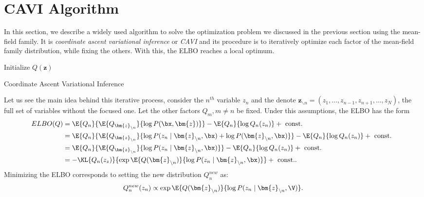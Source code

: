 \section{CAVI Algorithm }

In this section, we describe a widely used algorithm to solve the optimization problem we discussed in the previous section using the mean-field family. It is \emph{coordinate ascent variational inference} or \emph{CAVI} and its procedure is to iteratively optimize each factor of the mean-field family distribution, while fixing the others. With this, the ELBO reaches a local optimum.

 \begin{algorithm}[t]
  \SetAlgoLined
  Initialize \(Q(\bm{z})\)\;
  \;
  \caption{Coordinate Ascent Variational Inference}
  \label{alg:cavi}
\end{algorithm}

Let us see the main idea behind this iterative process, consider the \(n^{th}\) variable \(z_{n}\) and the denote \(\bm{z}_{\backslash n} = (z_{1},\dots,z_{n-1},z_{n+1},\dots,z_{N})\), the full set of variables without the focused one. Let the other factors \(Q_{m}, m\neq n\) be fixed. Under this assumptions, the ELBO has the form
\[
  \begin{aligned}
    ELBO(Q) &= \E{Q_{n}}{\E{Q_{\bm{z}_{\backslash n}}}{\log{P(\bx, \bm{z})}}} - \E{Q_{n}}{\log{Q_{n}(z_{n})}} + \text{ const. }\\
    &= \E{Q_{n}}{\E{Q_{\bm{z}_{\backslash n}}}{\log{P(z_{n} \mid \bm{z}_{\backslash n}, \bx)} + \log{P(\bm{z}_{\backslash n}, \bx)}}} - \E{Q_{n}}{\log{Q_{n}(z_{n})}} + \text{ const. }\\
    &=  \E{Q_{n}}{\E{Q_{\bm{z}_{\backslash n}}}{\log{P(z_{n} \mid \bm{z}_{\backslash n}, \bx)}}} - \E{Q_{n}}{\log{Q_{n}(z_{n})}} + \text{ const. }\\
    &= - \KL{Q_{n}(z_{z})}{  \exp{\E{Q(\bm{z}_{\backslash n})}{\log{P(z_{n} \mid \bm{z}_{\backslash n}, \bx)}}} } + \text{ const.}.
  \end{aligned}
\]
Minimizing the ELBO corresponds to setting the new distribution \(Q_{n}^{new}\) as:
\[
  Q_{n}^{new}(z_{n}) \propto \exp{\E{Q(\bm{z}_{\backslash n})}{\log{P(z_{n} \mid \bm{z}_{\backslash n}, \V)}}}.
\]

